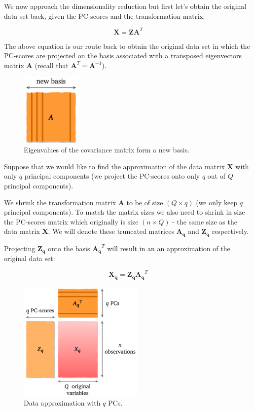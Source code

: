\documentclass[10pt,twocolumn]{article}
\begin{document}
We now approach the dimensionality reduction but first let's obtain the original data set back, given the PC-scores and the transformation matrix:

\begin{equation} \label{eq:X-retrieval}
\bm{X} = \bm{Z} \bm{A}^T
\end{equation}

The above equation is our route back to obtain the original data set in which the PC-scores are projected on the basis associated with a transposed eigenvectors matrix $\bm{A}$ (recall that $\bm{A}^T = \bm{A}^{-1}$).

\begin{figure}
\centering\includegraphics[width=3cm]{new-basis.png}
\caption{Eigenvalues of the covariance matrix form a new basis.}
\label{fig:new-basis}
\end{figure}

Suppose that we would like to find the approximation of the data matrix $\bm{X}$ with only $q$ principal components (we project the PC-scores onto only $q$ out of $Q$ principal components).

We shrink the transformation matrix $\bm{A}$ to be of size $(Q \times q)$ (we only keep $q$ principal components). To match the matrix sizes we also need to shrink in size the PC-scores matrix which originally is size $(n \times Q)$ - the same size as the data matrix $\bm{X}$. We will denote these truncated matrices $\bm{A_q}$ and $\bm{Z_q}$ respectively.

Projecting $\bm{Z_q}$ onto the basis $\bm{A_q}^T$ will result in an an approximation of the original data set:

\begin{equation} \label{eq:X-approximation}
\bm{X_q} = \bm{Z_q} \bm{A_q}^T
\end{equation}


\begin{figure}[H]
\centering\includegraphics[width=6.1cm]{data-approx.png}
\caption{Data approximation with $q$ PCs.}
\label{fig:data-approx}
\end{figure}
\end{document}
